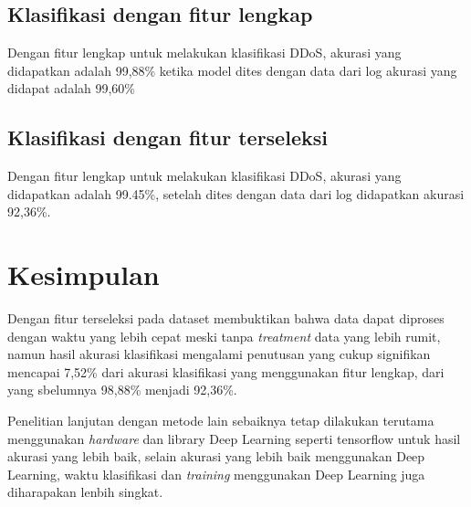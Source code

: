 \subsection{Klasifikasi dengan fitur lengkap}
Dengan fitur lengkap untuk melakukan klasifikasi DDoS, akurasi yang didapatkan adalah 99,88\% ketika model dites dengan data dari log akurasi yang didapat adalah 99,60\%

\subsection{Klasifikasi dengan fitur terseleksi}
Dengan fitur lengkap untuk melakukan klasifikasi DDoS, akurasi yang didapatkan adalah 99.45\%, setelah dites dengan data dari log didapatkan akurasi 92,36\%.

\section{Kesimpulan}

Dengan fitur terseleksi pada dataset membuktikan bahwa data dapat diproses dengan waktu yang lebih cepat meski tanpa \textit{treatment} data yang lebih rumit, namun hasil akurasi klasifikasi mengalami penutusan yang cukup signifikan mencapai 7,52\% dari akurasi klasifikasi yang menggunakan fitur lengkap, dari yang sbelumnya 98,88\% menjadi 92,36\%. 

Penelitian lanjutan dengan metode lain sebaiknya tetap dilakukan terutama menggunakan \textit{hardware} dan library Deep Learning seperti tensorflow untuk hasil akurasi yang lebih baik, selain akurasi yang lebih baik menggunakan Deep Learning, waktu klasifikasi dan \textit{training} menggunakan Deep Learning juga diharapakan lenbih singkat.

\newpage


